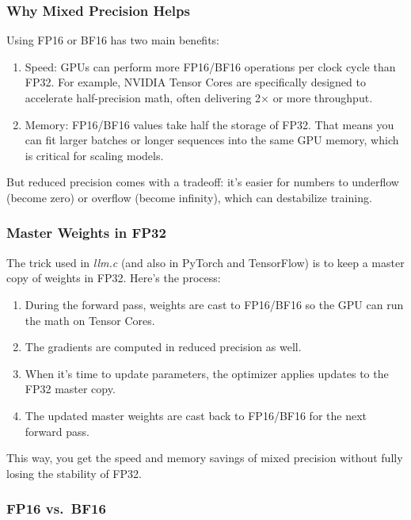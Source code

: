 \documentclass[
  letterpaper,
  DIV=11,
  numbers=noendperiod]{scrreprt}
\providecommand{\tightlist}{%
  \setlength{\itemsep}{0pt}\setlength{\parskip}{0pt}}
\begin{document}
\subsubsection{Why Mixed Precision
Helps}\label{why-mixed-precision-helps}

Using FP16 or BF16 has two main benefits:

\begin{enumerate}
\def\labelenumi{\arabic{enumi}.}
\tightlist
\item
  Speed: GPUs can perform more FP16/BF16 operations per clock cycle than
  FP32. For example, NVIDIA Tensor Cores are specifically designed to
  accelerate half-precision math, often delivering 2× or more
  throughput.
\item
  Memory: FP16/BF16 values take half the storage of FP32. That means you
  can fit larger batches or longer sequences into the same GPU memory,
  which is critical for scaling models.
\end{enumerate}

But reduced precision comes with a tradeoff: it's easier for numbers to
underflow (become zero) or overflow (become infinity), which can
destabilize training.

\subsubsection{Master Weights in FP32}\label{master-weights-in-fp32}

The trick used in \emph{llm.c} (and also in PyTorch and TensorFlow) is
to keep a master copy of weights in FP32. Here's the process:

\begin{enumerate}
\def\labelenumi{\arabic{enumi}.}
\tightlist
\item
  During the forward pass, weights are cast to FP16/BF16 so the GPU can
  run the math on Tensor Cores.
\item
  The gradients are computed in reduced precision as well.
\item
  When it's time to update parameters, the optimizer applies updates to
  the FP32 master copy.
\item
  The updated master weights are cast back to FP16/BF16 for the next
  forward pass.
\end{enumerate}

This way, you get the speed and memory savings of mixed precision
without fully losing the stability of FP32.

\subsubsection{FP16 vs.~BF16}\label{fp16-vs.-bf16}
\end{document}
